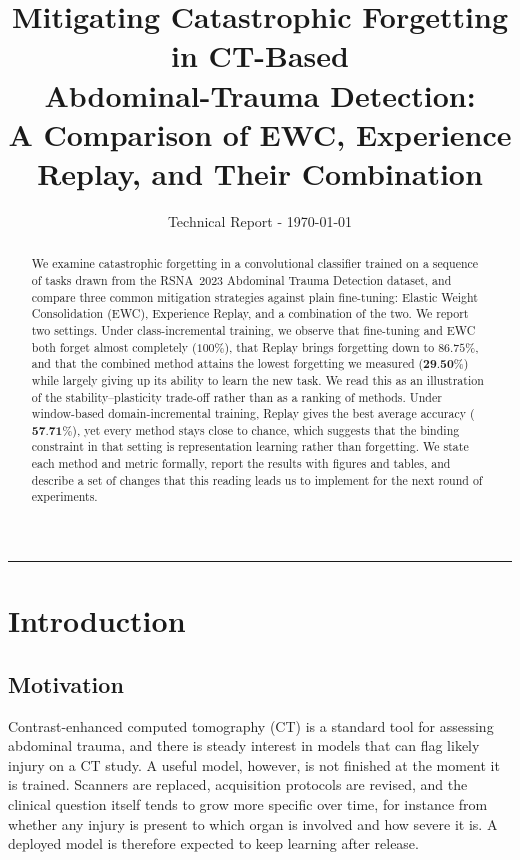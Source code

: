 \documentclass[11pt]{article}
\title{\textbf{Mitigating Catastrophic Forgetting in CT-Based\\
Abdominal-Trauma Detection:\\[2pt]
\large A Comparison of EWC, Experience Replay, and Their Combination}}
\author{}
\date{Technical Report - \today}
\newcommand{\best}[1]{\textbf{#1}}
\begin{document}
\maketitle
\vspace{-2.2em}
\begin{center}\rule{0.6\textwidth}{0.4pt}\end{center}

\begin{abstract}
\noindent
We examine catastrophic forgetting in a convolutional classifier trained on a
sequence of tasks drawn from the RSNA~2023 Abdominal Trauma Detection dataset,
and compare three common mitigation strategies against plain fine-tuning:
Elastic Weight Consolidation (EWC), Experience Replay, and a combination of the
two. We report two settings. Under class-incremental training, we observe that
fine-tuning and EWC both forget almost completely ($100\%$), that Replay brings
forgetting down to $86.75\%$, and that the combined method attains the lowest
forgetting we measured ($\best{29.50\%}$) while largely giving up its ability to
learn the new task. We read this as an illustration of the stability--plasticity
trade-off rather than as a ranking of methods. Under window-based
domain-incremental training, Replay gives the best average accuracy
($\best{57.71\%}$), yet every method stays close to chance, which suggests that
the binding constraint in that setting is representation learning rather than
forgetting. We state each method and metric formally, report the results with
figures and tables, and describe a set of changes that this reading leads us to
implement for the next round of experiments.
\end{abstract}

\section{Introduction}
\subsection{Motivation}
Contrast-enhanced computed tomography (CT) is a standard tool for assessing
abdominal trauma, and there is steady interest in models that can flag likely
injury on a CT study. A useful model, however, is not finished at the moment it
is trained. Scanners are replaced, acquisition protocols are revised, and the
clinical question itself tends to grow more specific over time, for instance from
whether any injury is present to which organ is involved and how severe it is. A
deployed model is therefore expected to keep learning after release.
\end{document}
